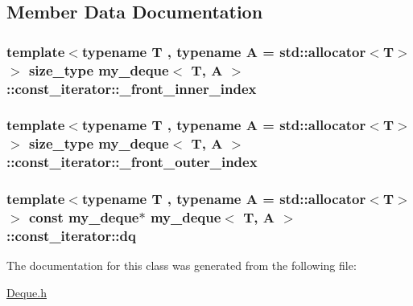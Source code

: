 \subsection{Member Data Documentation}
\hypertarget{classmy__deque_1_1const__iterator_a647322a455844b9a2cdc0fd93290b35a}{
\subsubsection[{\-\_\-front\-\_\-inner\-\_\-index}]{\setlength{\rightskip}{0pt plus 5cm}template$<$typename T , typename A  = std\-::allocator$<$\-T$>$$>$ {\bf size\-\_\-type} {\bf my\-\_\-deque}$<$ T, A $>$\-::const\-\_\-iterator\-::\-\_\-front\-\_\-inner\-\_\-index\hspace{0.3cm}{\ttfamily [private]}}}\label{classmy__deque_1_1const__iterator_a647322a455844b9a2cdc0fd93290b35a}
\hypertarget{classmy__deque_1_1const__iterator_a8d175fd85f28e6628334f2b1eb12b815}{
\subsubsection[{\-\_\-front\-\_\-outer\-\_\-index}]{\setlength{\rightskip}{0pt plus 5cm}template$<$typename T , typename A  = std\-::allocator$<$\-T$>$$>$ {\bf size\-\_\-type} {\bf my\-\_\-deque}$<$ T, A $>$\-::const\-\_\-iterator\-::\-\_\-front\-\_\-outer\-\_\-index\hspace{0.3cm}{\ttfamily [private]}}}\label{classmy__deque_1_1const__iterator_a8d175fd85f28e6628334f2b1eb12b815}
\hypertarget{classmy__deque_1_1const__iterator_a9208064ba233965d385cda00a7410e2c}{
\subsubsection[{dq}]{\setlength{\rightskip}{0pt plus 5cm}template$<$typename T , typename A  = std\-::allocator$<$\-T$>$$>$ const {\bf my\-\_\-deque}$\ast$ {\bf my\-\_\-deque}$<$ T, A $>$\-::const\-\_\-iterator\-::dq\hspace{0.3cm}{\ttfamily [private]}}}\label{classmy__deque_1_1const__iterator_a9208064ba233965d385cda00a7410e2c}


The documentation for this class was generated from the following file\-:\begin{DoxyCompactItemize}
\item 
\hyperlink{Deque_8h}{Deque.\-h}\end{DoxyCompactItemize}
